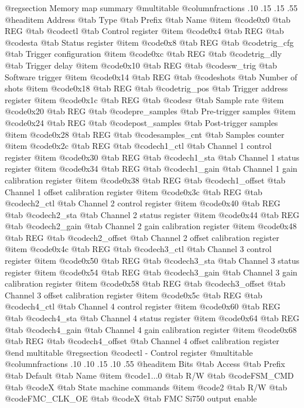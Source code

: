 @regsection Memory map summary
@multitable  @columnfractions .10 .15 .15 .55
@headitem Address @tab Type @tab Prefix @tab Name
@item @code{0x0} @tab
REG @tab
@code{ctl} @tab
Control register
@item @code{0x4} @tab
REG @tab
@code{sta} @tab
Status register
@item @code{0x8} @tab
REG @tab
@code{trig_cfg} @tab
Trigger configuration
@item @code{0xc} @tab
REG @tab
@code{trig_dly} @tab
Trigger delay
@item @code{0x10} @tab
REG @tab
@code{sw_trig} @tab
Software trigger
@item @code{0x14} @tab
REG @tab
@code{shots} @tab
Number of shots
@item @code{0x18} @tab
REG @tab
@code{trig_pos} @tab
Trigger address register
@item @code{0x1c} @tab
REG @tab
@code{sr} @tab
Sample rate
@item @code{0x20} @tab
REG @tab
@code{pre_samples} @tab
Pre-trigger samples
@item @code{0x24} @tab
REG @tab
@code{post_samples} @tab
Post-trigger samples
@item @code{0x28} @tab
REG @tab
@code{samples_cnt} @tab
Samples counter
@item @code{0x2c} @tab
REG @tab
@code{ch1_ctl} @tab
Channel 1 control register
@item @code{0x30} @tab
REG @tab
@code{ch1_sta} @tab
Channel 1 status register
@item @code{0x34} @tab
REG @tab
@code{ch1_gain} @tab
Channel 1 gain calibration register
@item @code{0x38} @tab
REG @tab
@code{ch1_offset} @tab
Channel 1 offset calibration register
@item @code{0x3c} @tab
REG @tab
@code{ch2_ctl} @tab
Channel 2 control register
@item @code{0x40} @tab
REG @tab
@code{ch2_sta} @tab
Channel 2 status register
@item @code{0x44} @tab
REG @tab
@code{ch2_gain} @tab
Channel 2 gain calibration register
@item @code{0x48} @tab
REG @tab
@code{ch2_offset} @tab
Channel 2 offset calibration register
@item @code{0x4c} @tab
REG @tab
@code{ch3_ctl} @tab
Channel 3 control register
@item @code{0x50} @tab
REG @tab
@code{ch3_sta} @tab
Channel 3 status register
@item @code{0x54} @tab
REG @tab
@code{ch3_gain} @tab
Channel 3 gain calibration register
@item @code{0x58} @tab
REG @tab
@code{ch3_offset} @tab
Channel 3 offset calibration register
@item @code{0x5c} @tab
REG @tab
@code{ch4_ctl} @tab
Channel 4 control register
@item @code{0x60} @tab
REG @tab
@code{ch4_sta} @tab
Channel 4 status register
@item @code{0x64} @tab
REG @tab
@code{ch4_gain} @tab
Channel 4 gain calibration register
@item @code{0x68} @tab
REG @tab
@code{ch4_offset} @tab
Channel 4 offset calibration register
@end multitable 
@regsection @code{ctl} - Control register
@multitable @columnfractions .10 .10 .15 .10 .55
@headitem Bits @tab Access @tab Prefix @tab Default @tab Name
@item @code{1...0}
@tab R/W @tab
@code{FSM_CMD}
@tab @code{X} @tab 
State machine commands
@item @code{2}
@tab R/W @tab
@code{FMC_CLK_OE}
@tab @code{X} @tab 
FMC Si750 output enable
